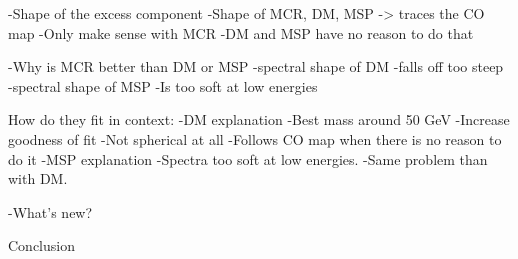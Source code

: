 		-Shape of the excess component		
			-Shape of MCR, DM, MSP -> traces the CO map
			-Only make sense with MCR
			-DM and MSP have no reason to do that

	
	-Why is MCR better than DM or MSP
		-spectral shape of DM
			-falls off too steep
		-spectral shape of MSP
			-Is too soft at low energies


How do they fit in context:
	-DM explanation
		-Best mass around 50 GeV
		-Increase goodness of fit
		-Not spherical at all
		-Follows CO map when there is no reason to do it
	-MSP explanation
		-Spectra too soft at low energies.
		-Same problem than with DM.
		
	-What's new?
		

Conclusion

